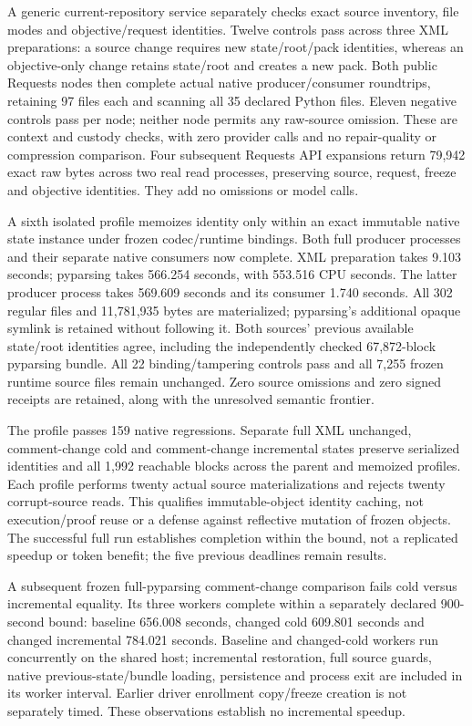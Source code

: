 A generic current-repository service separately checks exact source inventory,
file modes and objective/request identities. Twelve controls pass across three
XML preparations: a source change requires new state/root/pack identities,
whereas an objective-only change retains state/root and creates a new pack.
Both public Requests nodes then complete actual native producer/consumer
roundtrips, retaining 97 files each and scanning all 35 declared Python files.
Eleven negative controls pass per node; neither node permits any raw-source
omission. These are context and custody checks, with zero provider calls and
no repair-quality or compression comparison.
Four subsequent Requests API expansions return 79,942 exact raw bytes across
two real read processes, preserving source, request, freeze and objective
identities. They add no omissions or model calls.

A sixth isolated profile memoizes identity only within an exact immutable
native state instance under frozen codec/runtime bindings. Both full producer
processes and their separate native consumers now complete. XML preparation
takes 9.103 seconds; pyparsing takes 566.254 seconds, with
553.516 CPU seconds. The latter producer process takes 569.609
seconds and its consumer 1.740 seconds. All 302 regular files and
11,781,935 bytes are materialized; pyparsing's additional opaque symlink is
retained without following it. Both sources' previous available state/root
identities agree, including the independently checked 67,872-block pyparsing
bundle. All 22 binding/tampering controls pass and all 7,255 frozen runtime
source files remain unchanged. Zero source omissions and zero signed receipts
are retained, along with the unresolved semantic frontier.

The profile passes 159 native regressions. Separate full XML unchanged,
comment-change cold and comment-change incremental states preserve serialized
identities and all 1,992 reachable blocks across the parent and memoized
profiles. Each profile performs twenty actual source materializations and
rejects twenty corrupt-source reads. This qualifies immutable-object identity
caching, not execution/proof reuse or a defense against reflective mutation of
frozen objects. The successful full run establishes completion within the bound, not a
replicated speedup or token benefit; the five previous deadlines remain results.

A subsequent frozen full-pyparsing comment-change comparison fails cold versus
incremental equality. Its three workers complete within a separately declared
900-second bound: baseline 656.008 seconds, changed cold 609.801 seconds and
changed incremental 784.021 seconds. Baseline and changed-cold workers run
concurrently on the shared host; incremental restoration, full source guards,
native previous-state/bundle loading, persistence and process exit are included
in its worker interval. Earlier driver enrollment copy/freeze creation is not
separately timed. These observations establish no incremental speedup.

